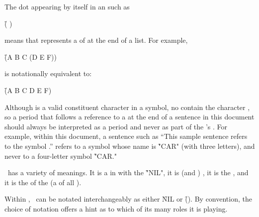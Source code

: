 \endsubsubsubsection%

The dot appearing by itself in an  such as

\f{(  {\dot} )}

means that  represents a  of  
at the end of a list.  For example,

\f{(A B C {\dot} (D E F))}

is notationally equivalent to:

\f{(A B C D E F)}

Although  is a valid constituent character in a symbol, no 
  contain the character ,
so a period that follows a reference to a  at the end of
a sentence in this document should always be interpreted as a period
and never as part of the 's .
For example, within this document, a sentence such as
 ``This sample sentence refers to the symbol .'' 
refers to a symbol whose name is \f{"CAR"} (with three letters),
and never to a four-letter symbol \f{"CAR."}

\endsubsubsubsection%
\idxterm{()}

\nil\ has a variety of meanings.
It is a  in  with the  \f{"NIL"},
it is  (and ) ,
it is the ,
and it is the  of the  (a  of all ).

Within \clisp, \nil\ can be notated interchangeably as either \f{NIL} or \f{()}.
By convention, the choice of notation offers a hint as to which of its many
roles it is playing.


